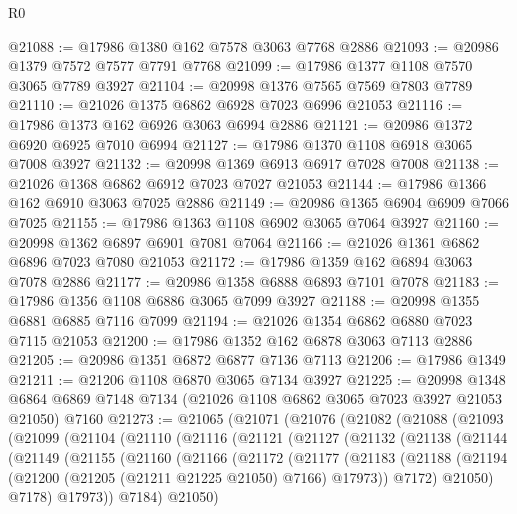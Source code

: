 \begin{lexlean}{R0}
\begin{coremodule}
@21088 := @17986 @1380 @162 @7578 @3063 @7768 @2886
@21093 := @20986 @1379 @7572 @7577 @7791 @7768
@21099 := @17986 @1377 @1108 @7570 @3065 @7789 @3927
@21104 := @20998 @1376 @7565 @7569 @7803 @7789
@21110 := @21026 @1375 @6862 @6928 @7023 @6996 @21053
@21116 := @17986 @1373 @162 @6926 @3063 @6994 @2886
@21121 := @20986 @1372 @6920 @6925 @7010 @6994
@21127 := @17986 @1370 @1108 @6918 @3065 @7008 @3927
@21132 := @20998 @1369 @6913 @6917 @7028 @7008
@21138 := @21026 @1368 @6862 @6912 @7023 @7027 @21053
@21144 := @17986 @1366 @162 @6910 @3063 @7025 @2886
@21149 := @20986 @1365 @6904 @6909 @7066 @7025
@21155 := @17986 @1363 @1108 @6902 @3065 @7064 @3927
@21160 := @20998 @1362 @6897 @6901 @7081 @7064
@21166 := @21026 @1361 @6862 @6896 @7023 @7080 @21053
@21172 := @17986 @1359 @162 @6894 @3063 @7078 @2886
@21177 := @20986 @1358 @6888 @6893 @7101 @7078
@21183 := @17986 @1356 @1108 @6886 @3065 @7099 @3927
@21188 := @20998 @1355 @6881 @6885 @7116 @7099
@21194 := @21026 @1354 @6862 @6880 @7023 @7115 @21053
@21200 := @17986 @1352 @162 @6878 @3063 @7113 @2886
@21205 := @20986 @1351 @6872 @6877 @7136 @7113
@21206 := @17986 @1349
@21211 := @21206 @1108 @6870 @3065 @7134 @3927
@21225 := @20998
    @1348
    @6864
    @6869
    @7148
    @7134
    (@21026 @1108 @6862 @3065 @7023 @3927 @21053 @21050)
    @7160
@21273 := @21065
    (@21071
      (@21076
        (@21082
          (@21088
            (@21093
              (@21099
                (@21104
                  (@21110
                    (@21116
                      (@21121
                        (@21127
                          (@21132
                            (@21138
                              (@21144
                                (@21149
                                  (@21155
                                    (@21160
                                      (@21166
                                        (@21172
                                          (@21177
                                            (@21183
                                              (@21188
                                                (@21194
                                                  (@21200
                                                    (@21205 (@21211 @21225 @21050) @7166)
                                                    @17973))
                                                @7172)
                                              @21050)
                                            @7178)
                                          @17973))
                                      @7184)
                                    @21050)

\end{coremodule}
\end{lexlean}
